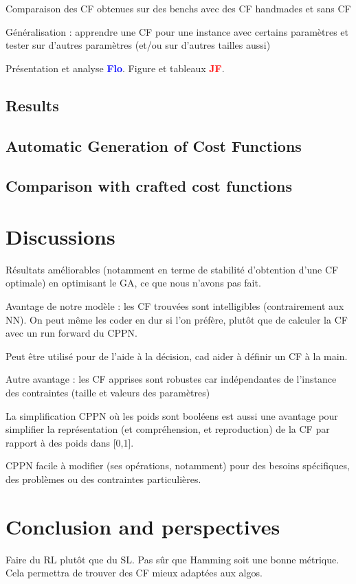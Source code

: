 \documentclass{article}
\newcommand{\flo}{\textcolor{blue}{\bf Flo}\xspace}
\newcommand{\jf}{\textcolor{red}{\bf JF}\xspace}
\begin{document}
Comparaison des  CF obtenues sur des  benchs avec des CF  handmades et
sans CF

Généralisation  : apprendre  une CF  pour une  instance avec  certains
paramètres  et  tester sur  d'autres  paramètres  (et/ou sur  d'autres
tailles aussi)

Présentation et analyse \flo.
Figure et tableaux \jf.

\subsection{Results}

\subsection{Automatic Generation of Cost Functions}
\label{subsec:xpgeneration}

\subsection{Comparison with crafted cost functions}\label{subsec:xpcomparison}

\section{Discussions}

Résultats améliorables  (notamment en  terme de  stabilité d'obtention
d'une CF optimale) en optimisant le GA, ce que nous n'avons pas fait.

Avantage  de  notre  modèle  :  les  CF  trouvées  sont  intelligibles
(contrairement aux NN). On peut même les coder en dur si l'on préfère,
plutôt que de calculer la CF avec un run forward du CPPN.

Peut être utilisé pour de l'aide à la décision, cad aider à définir un
CF à la main.

Autre avantage  : les CF  apprises sont robustes car  indépendantes de
l'instance des contraintes (taille et valeurs des paramètres)

La  simplification CPPN  où  les  poids sont  booléens  est aussi  une
avantage  pour  simplifier  la représentation  (et  compréhension,  et
reproduction) de la CF par rapport à des poids dans [0,1].

CPPN facile  à modifier (ses  opérations, notamment) pour  des besoins
spécifiques, des problèmes ou des contraintes particulières.


\section{Conclusion and perspectives}\label{sec:conclusion}

Faire du  RL plutôt  que du  SL. Pas  sûr que  Hamming soit  une bonne
métrique. Cela permettra de trouver des CF mieux adaptées aux algos.




\end{document}
